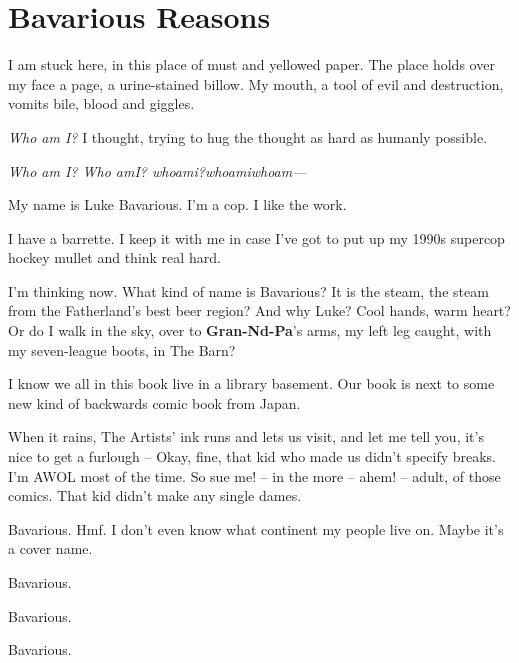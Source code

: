 \chapter{Bavarious Reasons}





I am stuck here, in this place of must and yellowed paper. The
place holds over my face a page, a urine-stained billow. My mouth,
a tool of evil and destruction, vomits bile, blood and
giggles.



{\em Who am I?} I thought, trying to hug the thought as hard as
humanly possible.



{\em Who am I? Who amI? whoami?whoamiwhoam---}





My name is Luke Bavarious. I'm a cop. I like the work.



I have a barrette. I keep it with me in case I've got to put up my
1990s supercop hockey mullet and think real hard.



I'm thinking now. What kind of name is Bavarious? It is the steam, the
steam from the Fatherland's best beer region? And why Luke?  Cool hands,
warm heart? Or do I walk in the sky, over to {\bf Gran-Nd-Pa}'s arms, my
left leg caught, with my seven-league boots, in The Barn?



I know we all in this book live in a library basement. Our book is
next to some new kind of backwards comic book from Japan.



When it rains, The Artists' ink runs and lets us visit, and let me
tell you, it's nice to get a furlough -- Okay, fine, that kid who
made us didn't specify breaks. I'm AWOL most of the time. So sue
me! -- in the more -- ahem! -- adult, of those comics. That kid
didn't make any single dames.



Bavarious. Hmf. I don't even know what continent my people live on.
Maybe it's a cover name.



Bavarious.



Bavarious.



Bavarious.



